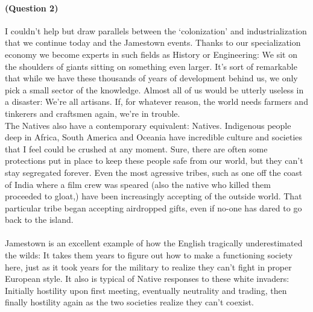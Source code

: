 \documentclass[13pt]{article}
\begin{document}
\newpage

\paragraph{(Question 2)} I couldn't help but draw parallels between the `colonization' and industrialization that we continue today and the Jamestown events. Thanks to our specialization economy we become experts in such fields as History or Engineering: We sit on the shoulders of giants sitting on something even larger. It's sort of remarkable that while we have these thousands of years of development behind us, we only pick a small sector of the knowledge. Almost all of us would be utterly useless in a disaster: We're all artisans. If, for whatever reason, the world needs farmers and tinkerers and craftsmen again, we're in trouble. \\
The Natives also have a contemporary equivalent: Natives. Indigenous people deep in Africa, South America and Oceania have incredible culture and societies that I feel could be crushed at any moment. Sure, there are often some protections put in place to keep these people safe from our world, but they can't stay segregated forever. Even the most agressive tribes, such as one off the coast of India where a film crew was speared (also the native who killed them proceeded to gloat,) have been increasingly accepting of the outside world. That particular tribe began accepting airdropped gifts, even if no-one has dared to go back to the island.

\paragraph{} Jamestown is an excellent example of how the English tragically underestimated the wilds: It takes them years to figure out how to make a functioning society here, just as it took years for the military to realize they can't fight in proper European style. It also is typical of Native responses to these white invaders: Initially hostility upon first meeting, eventually neutrality and trading, then finally hostility again as the two societies realize they can't coexist.
\end{document}
